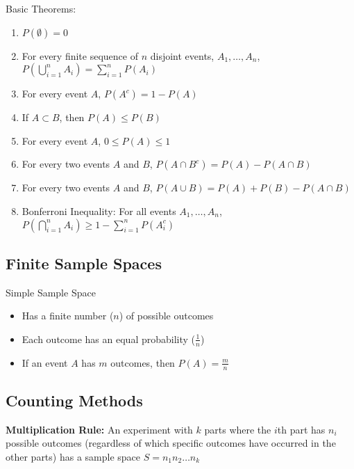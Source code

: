 \documentclass[11pt]{article}
\begin{document}
Basic Theorems:
\begin{enumerate}
    \item $P(\emptyset) = 0$
    \item For every finite sequence of $n$ disjoint events, $A_1, \ldots, A_n$, $P( 
    \bigcup_{i=1}^{n} A_i) = \sum_{i=1}^{n}P(A_i)$
    \item For every event $A$, $P(A^c) = 1 - P(A)$
    \item If $A \subset B$, then $P(A) \le P(B)$
    \item For every event $A$, $0 \le P(A) \le 1$
    \item For every two events $A$ and $B$, $P(A \cap B^c) = P(A) - P(A \cap B)$
    \item For every two events $A$ and $B$, $P(A \cup B) = P(A) + P(B) - P(A \cap B)$
    \item Bonferroni Inequality: For all events $A_1, \ldots, A_n$, $P(\bigcap_{i=1}^{n} A_i) 
    \ge 1 - \sum_{i=1}^{n} P(A_i^c)$
\end{enumerate}

\subsection{Finite Sample Spaces}

Simple Sample Space
\begin{itemize}
    \item Has a finite number ($n$) of possible outcomes
    \item Each outcome has an equal probability ($\frac{1}{n}$)
    \item If an event $A$ has $m$ outcomes, then $P(A) = \frac{m}{n}$
\end{itemize}

\subsection{Counting Methods}

\textbf{Multiplication Rule:} An experiment with $k$ parts where the $i$th part has $n_i$ 
possible outcomes (regardless of which specific outcomes have occurred in the other parts) has 
a sample space $S = n_1 n_2 \ldots n_k$ \\
\end{document}
